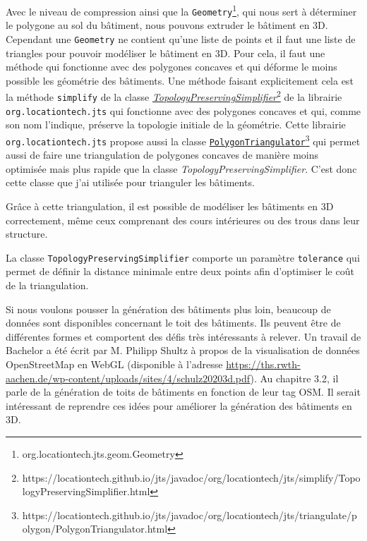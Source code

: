 Avec le niveau de compression ainsi que la \texttt{Geometry}\footnote{org.locationtech.jts.geom.Geometry}, qui nous sert à déterminer le polygone au sol du bâtiment, nous pouvons extruder le bâtiment en 3D. Cependant une \texttt{Geometry} ne contient qu'une liste de points et il faut une liste de triangles pour pouvoir modéliser le bâtiment en 3D. Pour cela, il faut une méthode qui fonctionne avec des polygones concaves et qui déforme le moins possible les géométrie des bâtiments. Une méthode faisant explicitement cela est la méthode \texttt{simplify} de la classe \href{https://locationtech.github.io/jts/javadoc/org/locationtech/jts/simplify/TopologyPreservingSimplifier.html}{\textit{TopologyPreservingSimplifier}}\footnote{https://locationtech.github.io/jts/javadoc/org/locationtech/jts/simplify/TopologyPreservingSimplifier.html} de la librairie \texttt{org.locationtech.jts} qui fonctionne avec des polygones concaves et qui, comme son nom l'indique, préserve la topologie initiale de la géométrie. Cette librairie \texttt{org.locationtech.jts} propose aussi la classe \href{https://locationtech.github.io/jts/javadoc/org/locationtech/jts/triangulate/polygon/PolygonTriangulator.html}{\texttt{PolygonTriangulator}}\footnote{https://locationtech.github.io/jts/javadoc/org/locationtech/jts/triangulate/polygon/PolygonTriangulator.html} qui permet aussi de faire une triangulation de polygones concaves de manière moins optimisée mais plus rapide que la classe \textit{TopologyPreservingSimplifier}. C'est donc cette classe que j'ai utilisée pour trianguler les bâtiments.

Grâce à cette triangulation, il est possible de modéliser les bâtiments en 3D correctement, même ceux comprenant des cours intérieures ou des trous dans leur structure.

La classe \texttt{TopologyPreservingSimplifier} comporte un paramètre \texttt{tolerance} qui permet de définir la distance minimale entre deux points afin d'optimiser le coût de la triangulation.

Si nous voulons pousser la génération des bâtiments plus loin, beaucoup de données sont disponibles concernant le toit des bâtiments. Ils peuvent être de différentes formes et comportent des défis très intéressants à relever. Un travail de Bachelor a été écrit par M. Philipp Shultz à propos de la visualisation de données OpenStreetMap en WebGL (disponible à l'adresse \href{https://ths.rwth-aachen.de/wp-content/uploads/sites/4/schulz20203d.pdf}{https://ths.rwth-aachen.de/wp-content/uploads/sites/4/schulz20203d.pdf}). Au chapitre 3.2, il parle de la génération de toits de bâtiments en fonction de leur tag OSM. Il serait intéressant de reprendre ces idées pour améliorer la génération des bâtiments en 3D.

